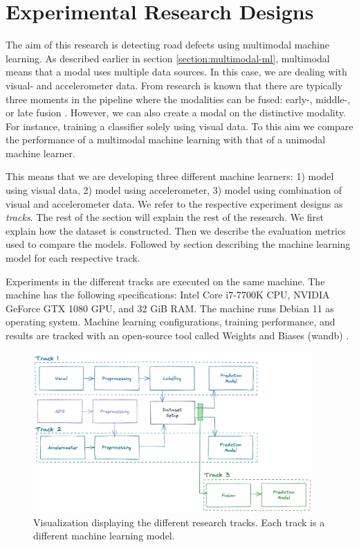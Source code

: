 \clearpage
\section{Experimental Research Designs}
\label{sec:experimental-design}

The aim of this research is detecting road defects using multimodal machine learning. As described earlier in section \ref{section:multimodal-ml}, multimodal means that a modal uses multiple data sources. In this case, we are dealing with visual- and accelerometer data. From research is known that there are typically three moments in the pipeline where the modalities can be fused: early-, middle-, or late fusion \cite{Baltrusaitis2017}. However, we can also create a modal on the distinctive modality. For instance, training a classifier solely using visual data. To this aim we compare the performance of a multimodal machine learning with that of a unimodal machine learner.

This means that we are developing three different machine learners: 1) model using visual data, 2) model using accelerometer, 3) model using combination of visual and accelerometer data. We refer to the respective experiment designs as \textit{tracks}. The rest of the section will explain the rest of the research. We first explain how the dataset is constructed. Then we describe the evaluation metrics used to compare the models. Followed by section describing the machine learning model for each respective track.

Experiments in the different tracks are executed on the same machine. The machine has the following specifications: Intel Core i7-7700K CPU, NVIDIA GeForce GTX 1080 GPU, and 32 GiB RAM. The machine runs Debian 11 as operating system. Machine learning configurations, training performance, and results are tracked with an open-source tool called Weights and Biases (wandb) \cite{wandb}.


\begin{figure}[ht]
\begin{center}
\includegraphics[width=0.95\textwidth,keepaspectratio]{images/5_multimodal_fusion/research-tracks.png}
\captionsetup{width=.95\textwidth}
\caption{Visualization displaying the different research tracks. Each track is a different machine learning model.}
\label{fig:fusion-strategies}
\end{center}
\end{figure}


